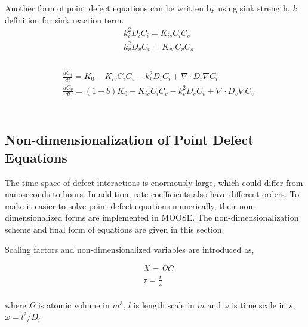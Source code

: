 \documentclass[a4paper]{article}
\begin{document}
Another form of point defect equations can be written by using sink strength, \textit{k} definition for sink reaction term.\\

\begin{equation}
  \begin{aligned}
    &k_i^2D_iC_i = K_{is}C_iC_s \\
    &k_v^2D_vC_v = K_{vs}C_vC_s \\
  \end{aligned}
  \label{equation:sink_reaction_term}
\end{equation}\\
\begin{equation}
  \begin{aligned}
    &\frac{dC_i}{dt} = K_0 - K_{iv}C_iC_v - k_i^2D_iC_i + \nabla\cdot D_i\nabla C_i\\
    &\frac{dC_v}{dt} = (1+b)K_0 - K_{iv}C_iC_v - k_v^2D_vC_v + \nabla\cdot D_v\nabla C_v\\
  \end{aligned}
  \label{equation:point_defect_equations_sink_strength}
\end{equation}\\

\subsection{Non-dimensionalization of Point Defect Equations} \hspace{10pt}
The time space of defect interactions is enormously large, which could differ from nanoseconds to hours. In addition, rate coefficients also have different orders. To make it easier to solve point defect equations numerically, their non-dimensionalized forms are implemented in MOOSE. The non-dimensionalization scheme and final form of equations are given in this section.

Scaling factors and non-dimensionalized variables are introduced as,

\begin{equation}
  \begin{aligned}
    &X = \Omega C\\
    &\tau = \frac{t}{\omega}\\
  \end{aligned}
  \label{equation:non-dimensionalization_variables}
\end{equation}

where ${\Omega}$ is atomic volume in ${m^3}$, ${l}$ is length scale in ${m}$ and ${\omega}$ is time scale in ${s}$, ${\omega= l^2/D_i}$\\
\end{document}
